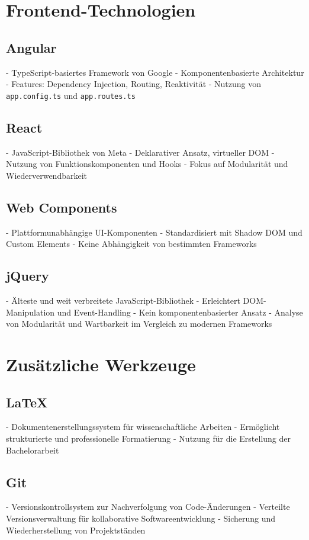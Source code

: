 \documentclass[oneside]{ausarbeitung}
\begin{document}
\section{Frontend-Technologien}

\subsection{Angular}
- TypeScript-basiertes Framework von Google  
- Komponentenbasierte Architektur  
- Features: Dependency Injection, Routing, Reaktivität  
- Nutzung von \texttt{app.config.ts} und \texttt{app.routes.ts}  

\subsection{React}
- JavaScript-Bibliothek von Meta  
- Deklarativer Ansatz, virtueller DOM  
- Nutzung von Funktionskomponenten und Hooks  
- Fokus auf Modularität und Wiederverwendbarkeit  

\subsection{Web Components}
- Plattformunabhängige UI-Komponenten  
- Standardisiert mit Shadow DOM und Custom Elements  
- Keine Abhängigkeit von bestimmten Frameworks  

\subsection{jQuery}
- Älteste und weit verbreitete JavaScript-Bibliothek  
- Erleichtert DOM-Manipulation und Event-Handling  
- Kein komponentenbasierter Ansatz  
- Analyse von Modularität und Wartbarkeit im Vergleich zu modernen Frameworks  

\section{Zusätzliche Werkzeuge}

\subsection{LaTeX}
- Dokumentenerstellungssystem für wissenschaftliche Arbeiten  
- Ermöglicht strukturierte und professionelle Formatierung  
- Nutzung für die Erstellung der Bachelorarbeit  

\subsection{Git}
- Versionskontrollsystem zur Nachverfolgung von Code-Änderungen  
- Verteilte Versionsverwaltung für kollaborative Softwareentwicklung  
- Sicherung und Wiederherstellung von Projektständen  
\end{document}
